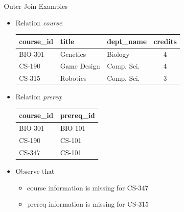 \documentclass{beamer}
\begin{document}
\begin{frame}{Outer Join Examples}
    \begin{itemize}
        \item Relation \textit{course}: \\
            \vspace{2mm}
            \begin{tabular}{| l | l | l | c |}
                \hline
                \textbf{course\_id} & \textbf{title} & \textbf{dept\_name} & \textbf{credits} \\
                \hline
                BIO-301 & Genetics    & Biology    & 4 \\
                \hline
                CS-190  & Game Design & Comp. Sci. & 4 \\
                \hline
                CS-315  & Robotics    & Comp. Sci. & 3 \\
                \hline
            \end{tabular}
        \item Relation \textit{prereq}: \\
            \vspace{2mm}
            \begin{tabular}{| l | l |}
                \hline
                \textbf{course\_id} & \textbf{prereq\_id} \\
                \hline
                BIO-301 & BIO-101 \\
                \hline
                CS-190  & CS-101  \\
                \hline
                CS-347  & CS-101  \\
                \hline
            \end{tabular}
            \vspace{1mm}
        \item Observe that
        \begin{itemize}
            \item course information is missing for CS-347
            \item prereq information is missing for CS-315
        \end{itemize}
    \end{itemize}
\end{frame}
\end{document}
